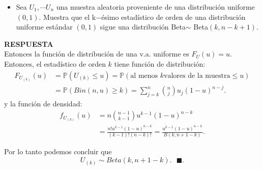 \documentclass[11pt,letterpaper]{article}
\newcommand{\mP}{\mathbb{P}}
\newcommand{\res}{\textbf{RESPUESTA}\\}
\newcommand{\finf}{\blacksquare.}
\begin{document}
\begin{enumerate}
\begin{itemize}
\item  Sea $U_1 ,\cdots U_n$ una muestra aleatoria proveniente de una distribución uniforme$(0,1)$. Muestra que
el k$-$ésimo estadístico de orden de una distribución uniforme estándar $(0,1)$ sigue una distribución Beta$\sim$ Beta$(k, n - k + 1)$.
\end{itemize}
 
\res  Entonces la función de distribución de una v.a. uniforme es $F_U(u)=u.$ Entonces, el estadístico de orden $k$ tiene función de distribución:
\begin{align*}
F_{U_{(k)}}(u)&=\mP(U_{(k)} \leq u) = \mP(\text{al menos } k \text{valores de la muestra} \leq u)\\
&=\mP(Bin(n,u)\geq k) =\sum_{j=k}^n {n \choose j} u_j(1-u)^{n-j}.
\end{align*}
y la función de densidad:
\begin{align*}
f_{U_{(k)}}(u)&=n{n-1 \choose k-1}u^{k-1}(1-u)^{n-k}\\
&=\frac{n!u^{k-1}(1-u)^{n-k}}{(k-1)!(n-k)!}=\frac{u^{k-1}(1-u)^{n-k}}{B(k,n+1-k)}.
\end{align*}

Por lo tanto podemos concluir que 
$$U_{(k)}\sim Beta(k,n+1-k).\ \ \ \finf$$

\end{enumerate}
\end{document}
